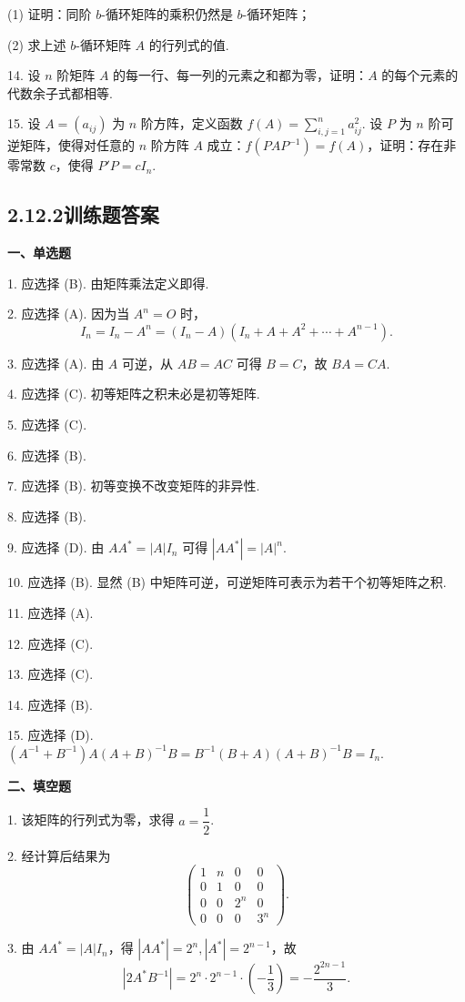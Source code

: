 \documentclass[UTF8,12pt,a4paper,fontset=fandol]{ctexart}
\begin{document}
(1) 证明：同阶 $b$-循环矩阵的乘积仍然是 $b$-循环矩阵；

(2) 求上述 $b$-循环矩阵 $A$ 的行列式的值.

14. 设 $n$ 阶矩阵 $A$ 的每一行、每一列的元素之和都为零，证明：$A$ 的每个元素的代数余子式都相等.

15. 设 $A=(a_{ij})$ 为 $n$ 阶方阵，定义函数 $f(A)=\sum\limits_{i,j=1}^n a_{ij}^2$. 设 $P$ 为 $n$ 阶可逆矩阵，使得对任意的 $n$ 阶方阵 $A$ 成立：$f(PAP^{-1})=f(A)$，证明：存在非零常数 $c$，使得 $P'P=cI_n$.

\subsection*{2.12.2\quad 训练题答案}

\noindent\textbf{一、单选题}

1. 应选择 (B). 由矩阵乘法定义即得.

2. 应选择 (A). 因为当 $A^n=O$ 时，
\[
I_n=I_n-A^n=(I_n-A)(I_n+A+A^2+\cdots+A^{n-1}).
\]

3. 应选择 (A). 由 $A$ 可逆，从 $AB=AC$ 可得 $B=C$，故 $BA=CA$.

4. 应选择 (C). 初等矩阵之积未必是初等矩阵.

5. 应选择 (C).

6. 应选择 (B).

7. 应选择 (B). 初等变换不改变矩阵的非异性.

8. 应选择 (B).

9. 应选择 (D). 由 $AA^*=|A|I_n$ 可得 $|AA^*|=|A|^n$.

10. 应选择 (B). 显然 (B) 中矩阵可逆，可逆矩阵可表示为若干个初等矩阵之积.

11. 应选择 (A).

12. 应选择 (C).

13. 应选择 (C).

14. 应选择 (B).

15. 应选择 (D). $(A^{-1}+B^{-1})A(A+B)^{-1}B=B^{-1}(B+A)(A+B)^{-1}B=I_n$.

\noindent\textbf{二、填空题}

1. 该矩阵的行列式为零，求得 $a=\dfrac12$.

2. 经计算后结果为
\[
\left(
\begin{array}{cccc}
1 & n & 0 & 0\\
0 & 1 & 0 & 0\\
0 & 0 & 2^n & 0\\
0 & 0 & 0 & 3^n
\end{array}
\right).
\]

3. 由 $AA^*=|A|I_n$，得 $|AA^*|=2^n, |A^*|=2^{n-1}$，故
\[
|2A^*B^{-1}|=2^n\cdot2^{n-1}\cdot\left(-\frac13\right)
=-\frac{2^{2n-1}}3.
\]
\end{document}
